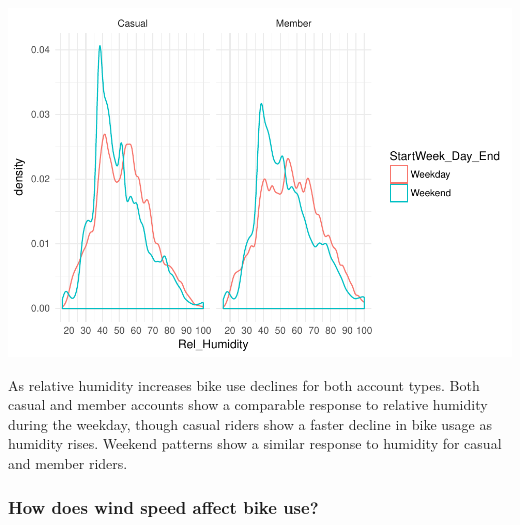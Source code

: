 \documentclass[]{article}
\newenvironment{Shaded}{\begin{snugshade}}{\end{snugshade}}
\newcommand{\KeywordTok}[1]{\textcolor[rgb]{0.13,0.29,0.53}{\textbf{#1}}}
\newcommand{\DataTypeTok}[1]{\textcolor[rgb]{0.13,0.29,0.53}{#1}}
\newcommand{\DecValTok}[1]{\textcolor[rgb]{0.00,0.00,0.81}{#1}}
\newcommand{\StringTok}[1]{\textcolor[rgb]{0.31,0.60,0.02}{#1}}
\newcommand{\CommentTok}[1]{\textcolor[rgb]{0.56,0.35,0.01}{\textit{#1}}}
\newcommand{\OperatorTok}[1]{\textcolor[rgb]{0.81,0.36,0.00}{\textbf{#1}}}
\newcommand{\NormalTok}[1]{#1}
\begin{document}
\includegraphics{Nice_Ride_Project_Stat_ReportDRAFT_files/figure-latex/unnamed-chunk-13-3.pdf}

As relative humidity increases bike use declines for both account types.
Both casual and member accounts show a comparable response to relative
humidity during the weekday, though casual riders show a faster decline
in bike usage as humidity rises. Weekend patterns show a similar
response to humidity for casual and member riders.

\subsubsection{How does wind speed affect bike
use?}\label{how-does-wind-speed-affect-bike-use}

\begin{Shaded}
\end{Shaded}
\end{document}

